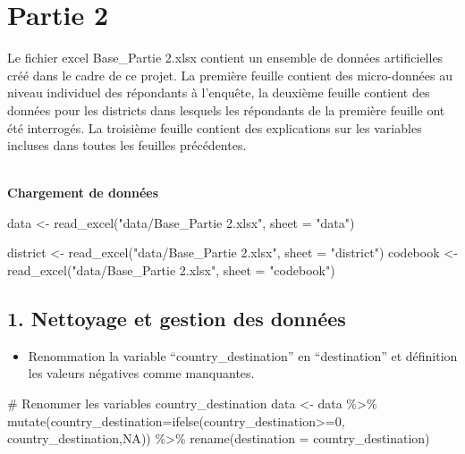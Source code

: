 \documentclass[
  letterpaper,
  DIV=11,
  numbers=noendperiod]{scrartcl}
\newenvironment{Shaded}{\begin{snugshade}}{\end{snugshade}}
\newcommand{\AttributeTok}[1]{\textcolor[rgb]{0.40,0.45,0.13}{#1}}
\newcommand{\CommentTok}[1]{\textcolor[rgb]{0.37,0.37,0.37}{#1}}
\newcommand{\ConstantTok}[1]{\textcolor[rgb]{0.56,0.35,0.01}{#1}}
\newcommand{\DecValTok}[1]{\textcolor[rgb]{0.68,0.00,0.00}{#1}}
\newcommand{\FunctionTok}[1]{\textcolor[rgb]{0.28,0.35,0.67}{#1}}
\newcommand{\NormalTok}[1]{\textcolor[rgb]{0.00,0.23,0.31}{#1}}
\newcommand{\OtherTok}[1]{\textcolor[rgb]{0.00,0.23,0.31}{#1}}
\newcommand{\SpecialCharTok}[1]{\textcolor[rgb]{0.37,0.37,0.37}{#1}}
\newcommand{\StringTok}[1]{\textcolor[rgb]{0.13,0.47,0.30}{#1}}
\providecommand{\tightlist}{%
  \setlength{\itemsep}{0pt}\setlength{\parskip}{0pt}}\usepackage{longtable,booktabs,array}
\begin{document}
\hypertarget{partie-2}{%
\section{Partie 2}\label{partie-2}}

Le fichier excel Base\_Partie 2.xlsx contient un ensemble de données
artificielles créé dans le cadre de ce projet. La première feuille
contient des micro-données au niveau individuel des répondants à
l'enquête, la deuxième feuille contient des données pour les districts
dans lesquels les répondants de la première feuille ont été interrogés.
La troisième feuille contient des explications sur les variables
incluses dans toutes les feuilles précédentes.\\
\strut \\
\textbf{Chargement de données}

\begin{Shaded}
\begin{Highlighting}[]
\NormalTok{data }\OtherTok{\textless{}{-}} \FunctionTok{read\_excel}\NormalTok{(}\StringTok{"data/Base\_Partie 2.xlsx"}\NormalTok{, }
     \AttributeTok{sheet =} \StringTok{"data"}\NormalTok{)}


\NormalTok{district }\OtherTok{\textless{}{-}} \FunctionTok{read\_excel}\NormalTok{(}\StringTok{"data/Base\_Partie 2.xlsx"}\NormalTok{, }
     \AttributeTok{sheet =} \StringTok{"district"}\NormalTok{)}
\NormalTok{codebook }\OtherTok{\textless{}{-}} \FunctionTok{read\_excel}\NormalTok{(}\StringTok{"data/Base\_Partie 2.xlsx"}\NormalTok{, }
     \AttributeTok{sheet =} \StringTok{"codebook"}\NormalTok{)}
\end{Highlighting}
\end{Shaded}

\hypertarget{nettoyage-et-gestion-des-donnuxe9es}{%
\subsection{1. Nettoyage et gestion des
données}\label{nettoyage-et-gestion-des-donnuxe9es}}

\begin{itemize}
\tightlist
\item
  Renommation la variable ``country\_destination'' en ``destination'' et
  définition les valeurs négatives comme manquantes.
\end{itemize}

\begin{Shaded}
\begin{Highlighting}[]
\CommentTok{\# Renommer les variables country\_destination}
\NormalTok{data }\OtherTok{\textless{}{-}}\NormalTok{ data }\SpecialCharTok{\%\textgreater{}\%} 
          \FunctionTok{mutate}\NormalTok{(}\AttributeTok{country\_destination=}\FunctionTok{ifelse}\NormalTok{(country\_destination}\SpecialCharTok{\textgreater{}=}\DecValTok{0}\NormalTok{, country\_destination,}\ConstantTok{NA}\NormalTok{)) }\SpecialCharTok{\%\textgreater{}\%} 
            \FunctionTok{rename}\NormalTok{(}\AttributeTok{destination =}\NormalTok{ country\_destination)  }
\end{Highlighting}
\end{Shaded}
\end{document}
